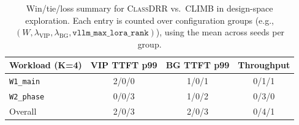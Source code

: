 \begin{table}[t]
\centering
\small
\setlength{\tabcolsep}{6pt}
\caption{Win/tie/loss summary for \textsc{ClassDRR} vs.\ \textsc{CLIMB} in design-space exploration.
Each entry is counted over configuration groups (e.g., $(W,\lambda_{\text{VIP}},\lambda_{\text{BG}},\texttt{vllm\_max\_lora\_rank})$),
using the mean across seeds per group.}
\begin{tabular}{lccc}
\toprule
\textbf{Workload (K=4)} & \textbf{\textsf{VIP} TTFT p99} & \textbf{\textsf{BG} TTFT p99} & \textbf{Throughput} \\
\midrule
\texttt{W1\_main}  & 2/0/0 & 1/0/1 & 0/1/1 \\
\texttt{W2\_phase} & 0/0/3 & 1/0/2 & 0/3/0 \\
\midrule
Overall             & 2/0/3 & 2/0/3 & 0/4/1 \\
\bottomrule
\end{tabular}
\vspace{2pt}

\label{tab:classdrr_wtl}
\end{table}

